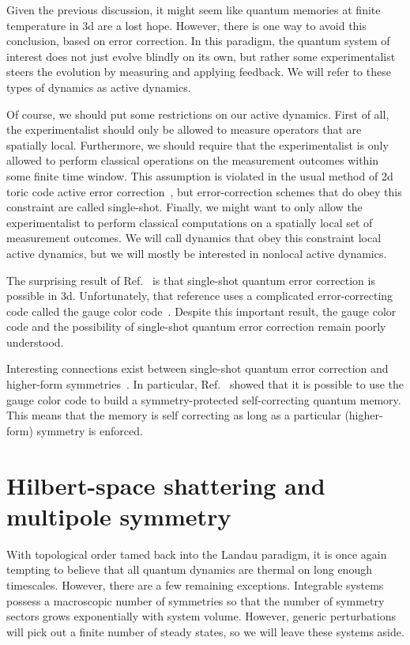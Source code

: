 Given the previous discussion, it might seem like quantum memories at finite temperature in 3d are a lost hope. However, there is one way to avoid this conclusion, based on error correction. In this paradigm, the quantum system of interest does not just evolve blindly on its own, but rather some experimentalist steers the evolution by measuring and applying feedback. We will refer to these types of dynamics as active dynamics. 

Of course, we should put some restrictions on our active dynamics. First of all, the experimentalist should only be allowed to measure operators that are spatially local. Furthermore, we should require that the experimentalist is only allowed to perform classical operations on the measurement outcomes within some finite time window. This assumption is violated in the usual method of 2d toric code active error correction~\cite{Dennis2002Topological}, but error-correction schemes that do obey this constraint are called single-shot. Finally, we might want to only allow the experimentalist to perform classical computations on a spatially local set of measurement outcomes. We will call dynamics that obey this constraint local active dynamics, but we will mostly be interested in nonlocal active dynamics.

The surprising result of Ref.~\cite{Bombin2015SingleShot} is that single-shot quantum error correction is possible in 3d. Unfortunately, that reference uses a complicated error-correcting code called the gauge color code~\cite{Bombin2015Gauge}. Despite this important result, the gauge color code and the possibility of single-shot quantum error correction remain poorly understood. 

Interesting connections exist between single-shot quantum error correction and higher-form symmetries~\cite{Roberts2017SPTO, Kubica2018Ungauging}. In particular, Ref.~\cite{RobertsBartlett2020} showed that it is possible to use the gauge color code to build a symmetry-protected self-correcting quantum memory. This means that the memory is self correcting as long as a particular (higher-form) symmetry is enforced.

\section{Hilbert-space shattering and multipole symmetry}

With topological order tamed back into the Landau paradigm, it is once again tempting to believe that all quantum dynamics are thermal on long enough timescales. However, there are a few remaining exceptions. Integrable systems possess a macroscopic number of symmetries so that the number of symmetry sectors grows exponentially with system volume. However, generic perturbations will pick out a finite number of steady states, so we will leave these systems aside.

